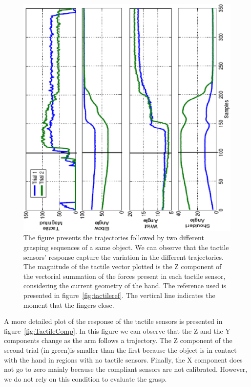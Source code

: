 \begin{figure}[tbp]
 \centerline{
 \includegraphics[height=\columnwidth, angle=270]{./figures/GrabingData11.eps}
 }\caption[Trajectories followed different grasping sequences of an object]
 {The figure presents the trajectories followed by two
 different grasping sequences of a same object. We can observe that
 the tactile sensors' response capture the variation in the different
 trajectories. The magnitude of the tactile vector plotted is the Z
 component of the vectorial summation of the forces present in each
 tactile sensor, considering the current geometry of the hand.
 The reference used is presented in figure~\ref{fig:tactileref}.
 The vertical line indicates
 the moment that the fingers close.} \label{fig:AnglesPlot}
 \end{figure}

A more detailed plot of the response of the tactile sensors is
presented in figure~\ref{fig:TactileComp}. In this figure we can
observe that the Z and the Y components change as the arm follows
a trajectory. The Z component of the second trial (in green)is
smaller than the first because the object is in contact with the
hand in regions with no tactile sensors. Finally, the X component
does not go to zero mainly because the compliant sensors are not
calibrated. However, we do not rely on this condition to evaluate
the grasp.


